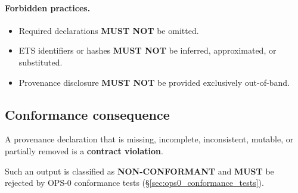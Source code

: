 \paragraph{Forbidden practices.}
\begin{itemize}
  \item Required declarations \textbf{MUST NOT} be omitted.
  \item ETS identifiers or hashes \textbf{MUST NOT}
        be inferred, approximated, or substituted.
  \item Provenance disclosure \textbf{MUST NOT}
        be provided exclusively out-of-band.
\end{itemize}

\subsection{Conformance consequence}
A provenance declaration that is missing, incomplete, inconsistent,
mutable, or partially removed
is a \textbf{contract violation}.

Such an output is classified as
\textbf{NON-CONFORMANT}
and \textbf{MUST} be rejected
by OPS-0 conformance tests
(\S\ref{sec:ops0_conformance_tests}).

